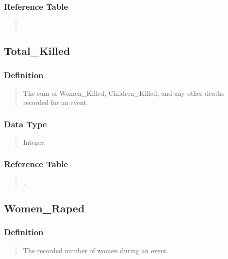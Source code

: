 \documentclass[letterpaper,10pt,english]{sphinxmanual}
\begin{document}
\subsubsection{Reference Table}
\label{\detokenize{schema_tables:id51}}\begin{quote}

\sphinxAtStartPar
{\hyperref[\detokenize{schema_tables:overview-table}]{}}.
\end{quote}


\subsection{Total\_Killed}
\label{\detokenize{schema_tables:total-killed}}

\subsubsection{Definition}
\label{\detokenize{schema_tables:id52}}\begin{quote}

\sphinxAtStartPar
The sum of Women\_Killed, Children\_Killed, and any other deaths recorded for an event.
\end{quote}


\subsubsection{Data Type}
\label{\detokenize{schema_tables:id53}}\begin{quote}

\sphinxAtStartPar
Integer.
\end{quote}


\subsubsection{Reference Table}
\label{\detokenize{schema_tables:id54}}\begin{quote}

\sphinxAtStartPar
{\hyperref[\detokenize{schema_tables:overview-table}]{}}.
\end{quote}


\subsection{Women\_Raped}
\label{\detokenize{schema_tables:women-raped}}

\subsubsection{Definition}
\label{\detokenize{schema_tables:id55}}\begin{quote}

\sphinxAtStartPar
The recorded number of women during an event.
\end{quote}
\end{document}
